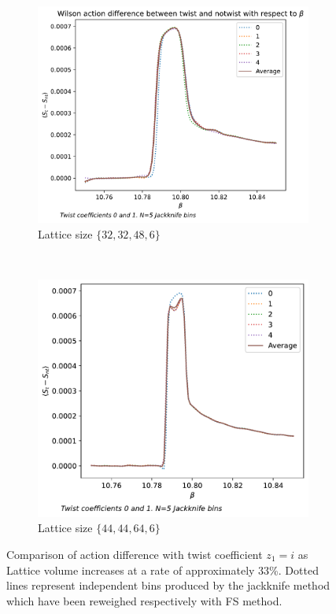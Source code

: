 \documentclass[english,twoside,openright]{UH_TCM_MSc}
\begin{document}
\begin{figure}[htpb]
    \begin{subfigure}[t]{0.5\textwidth}
        \centering
        \includegraphics[width=\textwidth]{final_plots/32_32_48/action_diff_0-1.pdf}
        \caption{Lattice size $\{32,32,48,6\}$}
    \end{subfigure}%
    ~ 
    \begin{subfigure}[t]{0.5\textwidth}
        \centering
        \includegraphics[width=\textwidth]{final_plots/44_44_64/action_diff_0-1.pdf}
        \caption{Lattice size $\{44,44,64,6\}$}
    \end{subfigure}
    \caption{Comparison of action difference with twist coefficient $z_1=i$ as Lattice volume increases at a rate of approximately $33$\%. Dotted lines represent independent bins produced by the jackknife method which have been reweighed respectively with FS method.} 
\end{figure}
\end{document}
